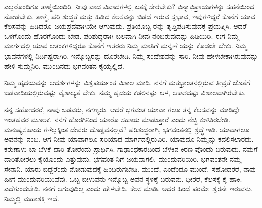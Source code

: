 ಎಲ್ಲರೊಂದಿಗೂ ತಾಳ್ಮೆಯಿಂದಿರಿ. ನೀವು ವಾದ ವಿವಾದಗಳಲ್ಲಿ ಏತಕ್ಕೆ ಸೇರಬೇಕು? ಭಿನ್ನಾಭಿಪ್ರಾಯಗಳನ್ನು ಸಹನೆಯಿಂದ ನೋಡಬೇಕು. ತಾಳ್ಮೆ, ಪರಿ ಶುದ್ಧತೆ ಮತ್ತು ಹಿಡಿದ ಕೆಲಸವನ್ನು ಬಿಡದೆ ಇರುವ ಸ್ವಭಾವ, ಇವುಗಳಿದ್ದರೆ ಕೊನೆಗೆ ಯಾವ ಕೆಲಸವನ್ನು ಹಿಡಿದರೂ ಜಯಪ್ರದವಾಗಿಯೇ ಆಗುವುದು. ಪ್ರತಿಯೊಬ್ಬ ರನ್ನು ತೃಪ್ತಿಪಡಿಸುವುದಕ್ಕೆ ಪ್ರಯತ್ನಿಸಿ. ಆದರೆ ಒಳಗೊಂದು ಹೊರಗೊಂದು ಬೇಡ. ಪರಿಶುದ್ಧರಾಗಿ ಬಲವಾಗಿ ನೀವು ನಂಬಿರುವುದನ್ನು ಹಿಡಿಯಿರಿ. ಈಗ ನಿಮ್ಮ ಮಾರ್ಗದಲ್ಲಿ ಯಾವ ಆತಂಕಗಳಿದ್ದರೂ ಕೊನೆಗೆ ಇತರರು ನಿಮ್ಮ ಮಾತಿಗೆ ಮನ್ನಣೆ ಯನ್ನು ಕೊಡಲೇ ಬೇಕು. ನಿಮ್ಮ ಭಾವನೆಗಳಲ್ಲಿ ನಿರ್ದಿಷ್ಟರಾಗಿರಿ. ಇನ್ನೊಬ್ಬರನ್ನು ದೂರಬೇಡಿ. ನಿಮ್ಮ ಸಂದೇಶವನ್ನು ಸಾರಿ. ನೀವು ಹೇಳಬೇಕಾಗಿರುವುದನ್ನು ಹೇಳಿ ಸುಮ್ಮನಿರಿ. ಮುಂದಿನದು ಭಗವಂತನ ಕೈಯ್ಯಲ್ಲಿದೆ.

ನಿಮ್ಮ ಹೃದಯವನ್ನು ಆದರ್ಶಗಳನ್ನು ವಿಶ್ವಪರ್ಯಂತ ವಿಶಾಲ ಮಾಡಿ. ನನಗೆ ಮತಭ್ರಾಂತನಲ್ಲಿರುವ ತೀವ್ರತೆ ಜೊತೆಗೆ ಜಡವಾದಿಯಲ್ಲಿರುವಷ್ಟು ವೈಶಾಲ್ಯತೆ ಬೇಕು. ನಮ್ಮ ಹೃದಯ ಕಡಲಿನಷ್ಟು ಆಳ, ಆಕಾಶದಷ್ಟು ವಿಶಾಲವಾಗಿರಬೇಕು.

ನನ್ನ ಸಹೋದರರೆ, ನಾವು ಬಡವರು, ನಗಣ್ಯರು. ಆದರೆ ಭಗವಂತ ಯಾವಾ ಗಲೂ ತನ್ನ ಕೆಲಸವನ್ನು ಮಾಡಿದ್ದೇ ಇಂತಹವರ ಮೂಲಕ. ನನಗೆ ಹೊರಗಿನಿಂದ ಯಾರೊ ಸಹಾಯ ಮಾಡುತ್ತಾರೆ ಎಂದು ನೆಚ್ಚಿ ಕುಳಿತಿರಬೇಡಿ. ಮನುಷ್ಯಸಹಾಯ ಗಳೆಲ್ಲಕ್ಕಿಂತ ದೇವರು ದೊಡ್ಡವನಲ್ಲವೆ? ಪರಿಶುದ್ಧರಾಗಿ, ಭಗವಂತನಲ್ಲಿ ಶ್ರದ್ಧೆ ಇಡಿ. ಯಾವಾಗಲೂ ಅವನನ್ನು ನಂಬಿ. ಆಗ ನೀವು ಯಾವಾಗಲೂ ಸರಿಯಾದ ಮಾರ್ಗದಲ್ಲಿರುವಿರಿ. ಯಾವುದೂ ನಿಮ್ಮನ್ನು ಕದಲಿಸಲಾರದು. ಕರುಣಾಳು ಬಾ ಬೆಳಕೆ ದಾರಿ ತೋರೆಂದು ಪ್ರಾರ್ಥಿಸಿ. ಗಾಢಾಂಧಕಾರದಿಂದ ಬೆಳಕಿನ ಕಿರಣ ವೊಂದು ಬರುವುದು. ನಮಗೆ ದಾರಿತೋರಲು ಕೈಯೊಂದು ಎತ್ತುವುದು. ಭಗವಂತ ನಿಗೆ ಜಯವಾಗಲಿ, ಮುಂದುವರಿಯಿರಿ. ಭಗವಂತನೇ ನಮ್ಮ ಸೇನಾನಿ. ಯಾರು ಬಿದ್ದರೆಂದು ನೋಡುವುದಕ್ಕೆ ಹಿಂದಿರುಗಬೇಡಿ. ಮುಂದೆ, ಎಂದೆಂದೂ ಮುಂದೆ. ಸಹೋದರರೆ, ನಾವು ಹೀಗೆ ಮುಂದುವರಿಯುವೆವು. ಒಬ್ಬ ಬೀಳುವನು ಇನ್ನೊಬ್ಬ ಅವನ ಸ್ಥಳಕ್ಕೆ ಬರುವನು. ಧೀರರೆ, ಕೆಲಸಕ್ಕೆ ಕೈ ಹಾಕಿ. ಎದೆಗುಂದಬೇಡಿ. ನನಗೆ ಆಗುವುದಿಲ್ಲ ಎಂದು ಹೇಳಬೇಡಿ. ಕೆಲಸ ಮಾಡಿ. ಅದರ ಹಿಂದೆ ಪರಮೇ ಶ್ವರನೇ ಇರುವನು. ನಿಮ್ಮಲ್ಲಿ ಮಹಾಶಕ್ತಿ ಇದೆ.

